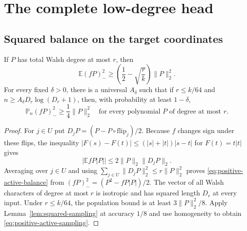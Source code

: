 \section{The complete low-degree head}\label{sec:head}
\subsection{Squared balance on the target coordinates}
\begin{lemma}
\label{lem:positive-active}
If $P$ has total Walsh degree at most $r$, then
\begin{equation}
 \mathbb E(fP)_-^2
 \ge\left(\frac12-\sqrt{\frac rk}\right)\|P\|_2^2.
 \label{eq:positive-active-balance}
\end{equation}
For every fixed $\delta>0$, there is a universal $A_\delta$ such that
if $r\le k/64$ and $n\ge A_\delta D_r\log(D_r+1)$, then, with
probability at least $1-\delta$,
\begin{equation}
 \mathbb P_n(fP)_-^2\ge\frac14\|P\|_2^2
 \quad\text{for every polynomial $P$ of degree at most $r$}.
 \label{eq:positive-active-sampling}
\end{equation}
\end{lemma}
\begin{proof}
For $j\in U$ put $D_jP=(P-P\circ\mathrm{flip}_j)/2$.
Because $f$ changes sign under these flips, the inequality
$|F(s)-F(t)|\le(|s|+|t|)|s-t|$ for $F(t)=t|t|$ gives
\[
 |\mathbb E fP|P||\le2\|P\|_2\|D_jP\|_2.
\]
Averaging over $j\in U$ and using
$\sum_{j\in U}\|D_jP\|_2^2\le r\|P\|_2^2$ proves
\eqref{eq:positive-active-balance} from
$(fP)_-^2=(P^2-fP|P|)/2$.
The vector of all Walsh characters of degree at most $r$ is isotropic
and has squared length $D_r$ at every input. Under $r\le k/64$,
the population bound is at least $3\|P\|_2^2/8$.
Apply Lemma~\ref{lem:squared-sampling} at accuracy $1/8$ and use
homogeneity to obtain \eqref{eq:positive-active-sampling}.
\end{proof}


